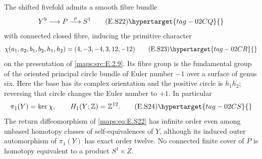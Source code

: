 \begin{theorem}\hypertarget{tag-02MD}{}\label{maps:src:E.2.13}


The shifted fivefold admits a smooth fibre bundle
\[
                  Y^9\longrightarrow P\stackrel{\rho}{\longrightarrow}S^1
 \tag{E.S22}\hypertarget{tag-02CQ}{}\label{maps:eq:E.S22}
\]
with connected closed fibre, inducing the primitive character
\[
 \chi(a_1,a_2,b_1,b_2,h_1,h_2)
                    =(4,-3,-4,3,12,-12)
 \tag{E.S23}\hypertarget{tag-02CR}{}\label{maps:eq:E.S23}
\]
on the presentation of \ref{maps:src:E.2.9}. Its fibre group is the fundamental
group of the oriented principal circle bundle of Euler number
$-1$ over a surface of genus six. Here the base has its complex
orientation and the positive circle is $h_1h_2$; reversing that
circle changes the Euler number to $+1$. In particular
\[
 \pi_1(Y)=\ker\chi,\qquad H_1(Y;\mathbb Z)=\mathbb Z^{12}.
 \tag{E.S24}\hypertarget{tag-02CS}{}\label{maps:eq:E.S24}
\]
The return diffeomorphism of \eqref{maps:eq:E.S22} has infinite order even
among unbased homotopy classes of self-equivalences of $Y$,
although its induced outer automorphism of $\pi_1(Y)$ has
exact order twelve. No connected finite cover of $P$ is
homotopy equivalent to a product $S^1\times Z$.


\end{theorem}


